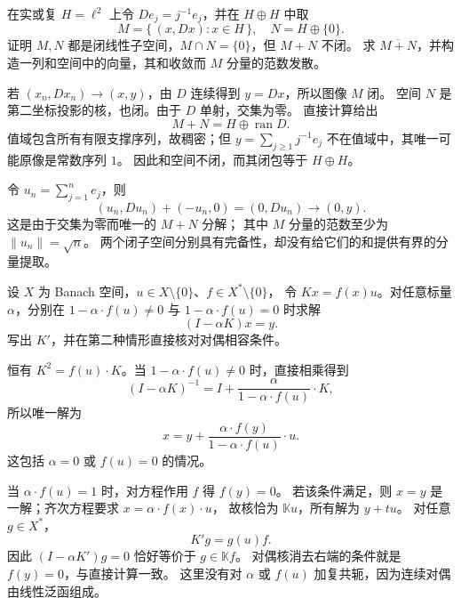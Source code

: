 \begin{exercise}\label{b1:ex:C1-nonclosed-sum}
在实或复 \(H=\ell^2\) 上令 \(De_j=j^{-1}e_j\)，并在 \(H\oplus H\) 中取
\[
 M=\{\,(x,Dx):x\in H\,\},\quad N=H\oplus\{0\}.
\]
证明 \(M,N\) 都是闭线性子空间，\(M\cap N=\{0\}\)，但 \(M+N\) 不闭。
求 \(\overline{M+N}\)，并构造一列和空间中的向量，其和收敛而 \(M\) 分量的范数发散。
\end{exercise}
\begin{solution}
若 \((x_n,Dx_n)\to(x,y)\)，由 \(D\) 连续得到 \(y=Dx\)，所以图像 \(M\) 闭。
空间 \(N\) 是第二坐标投影的核，也闭。由于 \(D\) 单射，交集为零。
直接计算给出
\[
 M+N=H\oplus\operatorname{ran}D.
\]
值域包含所有有限支撑序列，故稠密；但
\(y=\sum_{j\geq1}j^{-1}e_j\) 不在值域中，其唯一可能原像是常数序列 \(1\)。
因此和空间不闭，而其闭包等于 \(H\oplus H\)。

令 \(u_n=\sum_{j=1}^ne_j\)，则
\[
 (u_n,Du_n)+(-u_n,0)=(0,Du_n)\longrightarrow(0,y).
\]
这是由于交集为零而唯一的 \(M+N\) 分解；
其中 \(M\) 分量的范数至少为 \(\|u_n\|=\sqrt n\)。
两个闭子空间分别具有完备性，却没有给它们的和提供有界的分量提取。
\end{solution}

\begin{exercise}\label{b1:ex:C1-rank-one-fredholm}
设 \(X\) 为 Banach 空间，\(u\in X\setminus\{0\}\)、\(f\in X^*\setminus\{0\}\)，
令 \(Kx=f(x)u\)。对任意标量 \(\alpha\)，分别在
\(1-\alpha\cdot f(u)\ne0\) 与 \(1-\alpha\cdot f(u)=0\) 时求解
\[
 (I-\alpha K)x=y.
\]
写出 \(K'\)，并在第二种情形直接核对对偶相容条件。
\end{exercise}
\begin{solution}
恒有 \(K^2=f(u)\cdot K\)。当 \(1-\alpha\cdot f(u)\ne0\) 时，直接相乘得到
\[
 (I-\alpha K)^{-1}
 =I+\frac{\alpha}{1-\alpha\cdot f(u)}\cdot K,
\]
所以唯一解为
\[
 x=y+\frac{\alpha\cdot f(y)}{1-\alpha\cdot f(u)}\cdot u.
\]
这包括 \(\alpha=0\) 或 \(f(u)=0\) 的情况。

当 \(\alpha\cdot f(u)=1\) 时，对方程作用 \(f\) 得 \(f(y)=0\)。
若该条件满足，则 \(x=y\) 是一解；齐次方程要求 \(x=\alpha\cdot f(x)\cdot u\)，
故核恰为 \(\mathbb Ku\)，所有解为 \(y+tu\)。
对任意 \(g\in X^*\)，
\[
 K'g=g(u)f.
\]
因此 \((I-\alpha K')g=0\) 恰好等价于 \(g\in\mathbb Kf\)。
对偶核消去右端的条件就是 \(f(y)=0\)，与直接计算一致。
这里没有对 \(\alpha\) 或 \(f(u)\) 加复共轭，因为连续对偶由线性泛函组成。
\end{solution}

